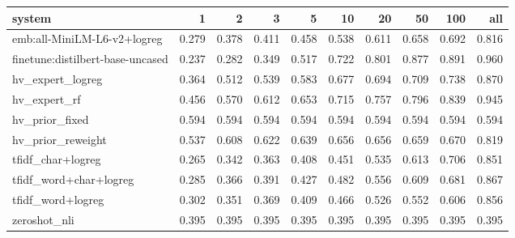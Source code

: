 \begin{tabular}{lrrrrrrrrr}
\toprule
system & 1 & 2 & 3 & 5 & 10 & 20 & 50 & 100 & all \\
\midrule
emb:all-MiniLM-L6-v2+logreg & 0.279 & 0.378 & 0.411 & 0.458 & 0.538 & 0.611 & 0.658 & 0.692 & 0.816 \\
finetune:distilbert-base-uncased & 0.237 & 0.282 & 0.349 & 0.517 & 0.722 & 0.801 & 0.877 & 0.891 & 0.960 \\
hv\_expert\_logreg & 0.364 & 0.512 & 0.539 & 0.583 & 0.677 & 0.694 & 0.709 & 0.738 & 0.870 \\
hv\_expert\_rf & 0.456 & 0.570 & 0.612 & 0.653 & 0.715 & 0.757 & 0.796 & 0.839 & 0.945 \\
hv\_prior\_fixed & 0.594 & 0.594 & 0.594 & 0.594 & 0.594 & 0.594 & 0.594 & 0.594 & 0.594 \\
hv\_prior\_reweight & 0.537 & 0.608 & 0.622 & 0.639 & 0.656 & 0.656 & 0.659 & 0.670 & 0.819 \\
tfidf\_char+logreg & 0.265 & 0.342 & 0.363 & 0.408 & 0.451 & 0.535 & 0.613 & 0.706 & 0.851 \\
tfidf\_word+char+logreg & 0.285 & 0.366 & 0.391 & 0.427 & 0.482 & 0.556 & 0.609 & 0.681 & 0.867 \\
tfidf\_word+logreg & 0.302 & 0.351 & 0.369 & 0.409 & 0.466 & 0.526 & 0.552 & 0.606 & 0.856 \\
zeroshot\_nli & 0.395 & 0.395 & 0.395 & 0.395 & 0.395 & 0.395 & 0.395 & 0.395 & 0.395 \\
\bottomrule
\end{tabular}
